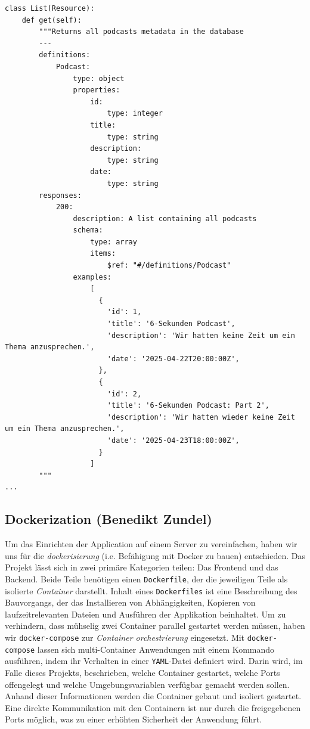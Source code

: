 \documentclass{article}
\begin{document}
\begin{lstlisting}[label=lst:listdoc, caption=Dokumentationskommentar des \texttt{/api/list} Endpunkts]
class List(Resource):
    def get(self):
        """Returns all podcasts metadata in the database
        ---
        definitions:
            Podcast:
                type: object
                properties:
                    id:
                        type: integer
                    title:
                        type: string
                    description:
                        type: string
                    date:
                        type: string
        responses:
            200:
                description: A list containing all podcasts
                schema:
                    type: array
                    items:
                        $ref: "#/definitions/Podcast"
                examples:
                    [
                      {
                        'id': 1,
                        'title': '6-Sekunden Podcast',
                        'description': 'Wir hatten keine Zeit um ein Thema anzusprechen.',
                        'date': '2025-04-22T20:00:00Z',
                      },
                      {
                        'id': 2,
                        'title': '6-Sekunden Podcast: Part 2',
                        'description': 'Wir hatten wieder keine Zeit um ein Thema anzusprechen.',
                        'date': '2025-04-23T18:00:00Z',
                      }
                    ]
        """
...
\end{lstlisting}

\subsection{Dockerization \small{(Benedikt Zundel)}}
Um das Einrichten der Application auf einem Server zu vereinfachen, haben wir uns für die \textit{dockerisierung} (i.e. Befähigung mit Docker zu bauen) entschieden. Das Projekt lässt sich in zwei primäre Kategorien teilen: Das Frontend und das Backend. Beide Teile benötigen einen \texttt{Dockerfile}, der die jeweiligen Teile als isolierte \textit{Container} darstellt. Inhalt eines \texttt{Dockerfiles} ist eine Beschreibung des Bauvorgangs, der das Installieren von Abhängigkeiten, Kopieren von laufzeitrelevanten Dateien und Ausführen der Applikation beinhaltet. Um zu verhindern, dass mühselig zwei Container parallel gestartet werden müssen, haben wir \texttt{docker-compose} zur \textit{Container orchestrierung} eingesetzt. Mit \texttt{docker-compose} lassen sich multi-Container Anwendungen mit einem Kommando ausführen, indem ihr Verhalten in einer \texttt{YAML}-Datei definiert wird. Darin wird, im Falle dieses Projekts, beschrieben, welche Container gestartet, welche Ports offengelegt und welche Umgebungsvariablen verfügbar gemacht werden sollen. Anhand dieser Informationen werden die Container gebaut und isoliert gestartet. Eine direkte Kommunikation mit den Containern ist nur durch die freigegebenen Ports möglich, was zu einer erhöhten Sicherheit der Anwendung führt.
\end{document}
